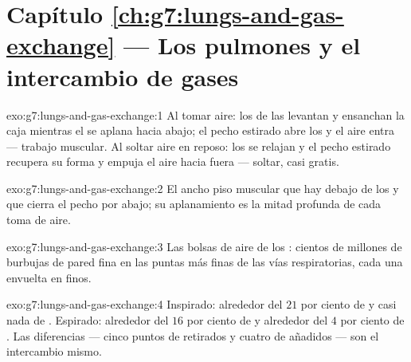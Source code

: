 \section*{Capítulo \ref{ch:g7:lungs-and-gas-exchange} --- Los pulmones y el intercambio de gases}

\begin{solution}{exo:g7:lungs-and-gas-exchange:1}
Al tomar aire: los  de las  levantan y ensanchan la
caja mientras el  se aplana hacia abajo; el pecho estirado
abre los  y el aire entra --- trabajo muscular. Al soltar aire
en reposo: los  se relajan y el pecho estirado recupera su
forma y empuja el aire hacia fuera --- soltar, casi gratis.
\end{solution}

\begin{solution}{exo:g7:lungs-and-gas-exchange:2}
El ancho piso muscular que hay debajo de los  y que cierra el
pecho por abajo; su aplanamiento es la mitad profunda de cada toma de
aire.
\end{solution}

\begin{solution}{exo:g7:lungs-and-gas-exchange:3}
Las bolsas de aire de los : cientos de millones de burbujas de
pared fina en las puntas más finas de las vías respiratorias, cada una
envuelta en  finos.
\end{solution}

\begin{solution}{exo:g7:lungs-and-gas-exchange:4}
Inspirado: alrededor del $21$ por ciento de  y casi nada de
. Espirado: alrededor del $16$ por ciento de 
y alrededor del $4$ por ciento de . Las diferencias
--- cinco puntos de  retirados y cuatro de 
añadidos --- son el intercambio mismo.
\end{solution}

